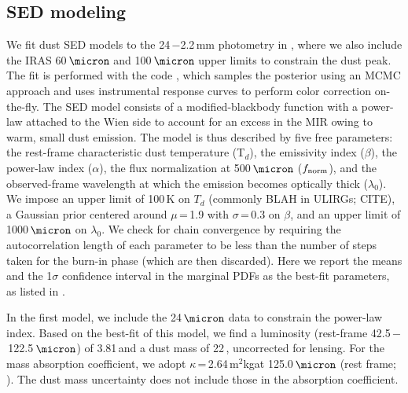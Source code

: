 \documentclass[]{emulateapj}
\begin{document}
\subsection{SED modeling} \label{sec:SED}  %
We fit dust SED models to the
24\,\micron$-$2.2\,mm photometry in , where we also
include the IRAS 60\,$\micron$ and 100\,$\micron$ upper limits
to constrain the dust peak.
The fit is performed with the code
 \citep[\eg][]{Riechers13a,Dowell14a}, which samples the posterior
using an MCMC approach and uses instrumental
response curves to perform color correction on-the-fly.
The SED model consists of a modified-blackbody
function with a power-law attached to the
Wien side to account for an excess in the MIR owing to warm,
small dust emission.
%
The model is thus described by five free parameters: the rest-frame characteristic dust
temperature (T$_{d}$), the emissivity index ($\beta$), the power-law index
($\alpha$), the flux normalization at 500\,$\micron$ ($f_{\rm norm}$), and
the observed-frame wavelength at which the emission
becomes optically thick ($\lambda_{0}$). We impose
an upper limit of 100\,K on $T_d$ (commonly BLAH in ULIRGs; CITE), 
a Gaussian prior centered around
$\mu$\,=\,1.9 with $\sigma$\,=\,0.3 on $\beta$, and an upper limit of
1000\,$\micron$ on $\lambda_0$.
We check for chain convergence by requiring the autocorrelation
length of each parameter to be less than the number of steps
taken for the burn-in phase (which are then discarded).
Here we report the means %
and the 1$\sigma$ confidence interval in the marginal PDFs
as the best-fit parameters, as listed in .



In the first model, we include the 24\,$\micron$ data
to constrain the power-law index. Based on the
best-fit of this model, we find a
\fir luminosity (rest-frame 42.5\,$-$\,122.5\,$\micron$) of
3.81\,\Lsun and a
dust mass of 22\,\Msun, uncorrected for lensing.
For the mass absorption coefficient, we adopt
$\kappa$\,=\,2.64\,m$^2$kg\pmOne at 125.0\,$\micron$
(rest frame; \citealt{Dunne03a}).
The dust mass uncertainty does not
include those in the absorption coefficient.
\end{document}
